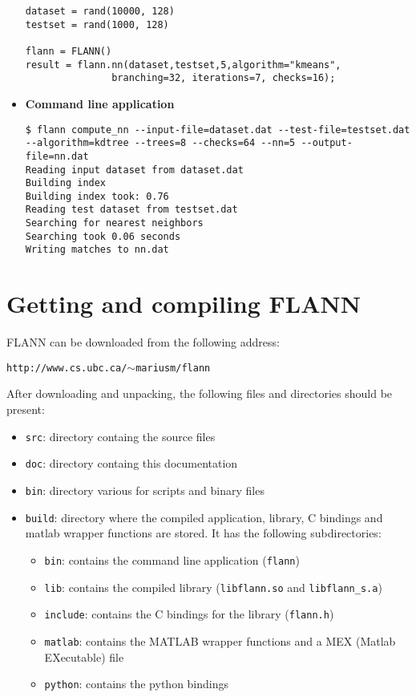 \documentclass[letter,10pt]{article}
\begin{document}
\begin{itemize}
\begin{Verbatim}[fontsize=\scriptsize,frame=single]
dataset = rand(10000, 128)
testset = rand(1000, 128)

flann = FLANN()
result = flann.nn(dataset,testset,5,algorithm="kmeans",
               branching=32, iterations=7, checks=16);
\end{Verbatim}

\item \textbf{Command line application}



\begin{Verbatim}[fontsize=\scriptsize,frame=single]
$ flann compute_nn --input-file=dataset.dat --test-file=testset.dat 
--algorithm=kdtree --trees=8 --checks=64 --nn=5 --output-file=nn.dat
Reading input dataset from dataset.dat
Building index
Building index took: 0.76
Reading test dataset from testset.dat
Searching for nearest neighbors
Searching took 0.06 seconds
Writing matches to nn.dat
\end{Verbatim}

\end{itemize}



\section{Getting and compiling FLANN}

FLANN can be downloaded from the following address:
\begin{center}
\texttt{http://www.cs.ubc.ca/$\sim$mariusm/flann}
\end{center}

After downloading and unpacking, the following files and directories should
be present:
\begin{itemize}
\item \texttt{src}: directory containg the source files
\item \texttt{doc}: directory containg this documentation
\item \texttt{bin}: directory various for scripts and binary files
\item \texttt{build}: directory where the compiled application, library, C
bindings and matlab wrapper functions are stored. It has the following
subdirectories:
\begin{itemize}
\item \texttt{bin}: contains the command line application (\texttt{flann})
\item \texttt{lib}: contains the compiled library (\texttt{libflann.so} and \texttt{libflann\_s.a})
\item \texttt{include}: contains the C bindings for the library (\texttt{flann.h})
\item \texttt{matlab}: contains the MATLAB wrapper functions and a MEX (Matlab EXecutable) file
\item \texttt{python}: contains the python bindings
\end{itemize}

\end{itemize}
\end{document}
